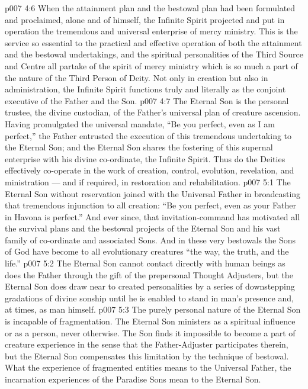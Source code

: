 \vs p007 4:6 \bibnobreakspace {} When the attainment plan and the bestowal plan had been formulated and proclaimed, alone and of himself, the Infinite Spirit projected and put in operation the tremendous and universal enterprise of mercy ministry. This is the service so essential to the practical and effective operation of both the attainment and the bestowal undertakings, and the spiritual personalities of the Third Source and Centre all partake of the spirit of mercy ministry which is so much a part of the nature of the Third Person of Deity. Not only in creation but also in administration, the Infinite Spirit functions truly and literally as the conjoint executive of the Father and the Son.
\vs p007 4:7 \pc The Eternal Son is the personal trustee, the divine custodian, of the Father’s universal plan of creature ascension. Having promulgated the universal mandate, “Be you perfect, even as I am perfect,” the Father entrusted the execution of this tremendous undertaking to the Eternal Son; and the Eternal Son shares the fostering of this supernal enterprise with his divine co\hyp{}ordinate, the Infinite Spirit. Thus do the Deities effectively co\hyp{}operate in the work of creation, control, evolution, revelation, and ministration --- and if required, in restoration and rehabilitation.
\vs p007 5:1 The Eternal Son without reservation joined with the Universal Father in broadcasting that tremendous injunction to all creation: “Be you perfect, even as your Father in Havona is perfect.” And ever since, that invitation\hyp{}command has motivated all the survival plans and the bestowal projects of the Eternal Son and his vast family of co\hyp{}ordinate and associated Sons. And in these very bestowals the Sons of God have become to all evolutionary creatures “the way, the truth, and the life.”
\vs p007 5:2 \pc The Eternal Son cannot contact directly with human beings as does the Father through the gift of the prepersonal Thought Adjusters, but the Eternal Son does draw near to created personalities by a series of downstepping gradations of divine sonship until he is enabled to stand in man’s presence and, at times, as man himself.
\vs p007 5:3 The purely personal nature of the Eternal Son is incapable of fragmentation. The Eternal Son ministers as a spiritual influence or as a person, never otherwise. The Son finds it impossible to become a part of creature experience in the sense that the Father\hyp{}Adjuster participates therein, but the Eternal Son compensates this limitation by the technique of bestowal. What the experience of fragmented entities means to the Universal Father, the incarnation experiences of the Paradise Sons mean to the Eternal Son.
